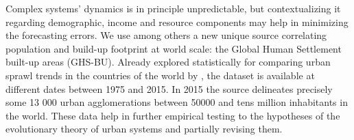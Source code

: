 \documentclass[11pt]{article}
\begin{document}
Complex systems’ dynamics is in principle unpredictable, but contextualizing it regarding demographic, income and resource components may help in minimizing the forecasting errors. We use among others a new unique source correlating population and build-up footprint at world scale: the Global Human Settlement built-up areas (GHS-BU). Already explored statistically for comparing urban sprawl trends in the countries of the world by \cite{denis2019population}, the dataset is available at different dates between 1975 and 2015. In 2015 the source delineates precisely some 13 000 urban agglomerations between 50000 and tens million inhabitants in the world. These data help in further empirical testing to the hypotheses of the evolutionary theory of urban systems and partially revising them.







\footnotesize



\end{document}
